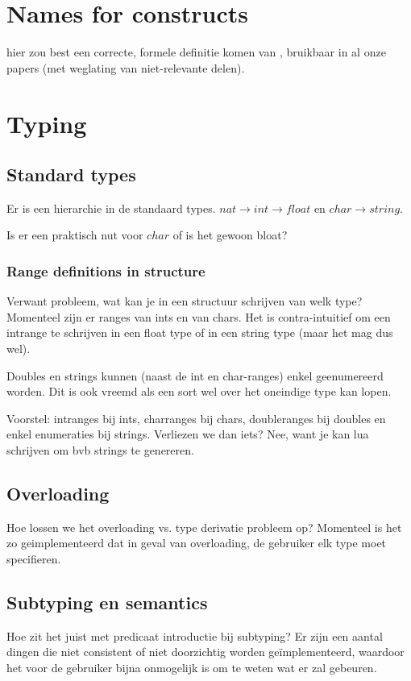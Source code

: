 \documentclass{article}
\begin{document}
\section{Names for \fodot constructs}
hier zou best een correcte, formele definitie komen van \fodot, bruikbaar in al onze papers (met weglating van niet-relevante delen).


\section{Typing}

\subsection{Standard types}
Er is een hierarchie in de standaard types. $nat \rightarrow int \rightarrow float$ en $char \rightarrow string$.

Is er een praktisch nut voor $char$ of is het gewoon bloat?

\subsubsection{Range definitions in structure}
Verwant probleem, wat kan je in een structuur schrijven van welk type? 
Momenteel zijn er ranges van ints en van chars.
Het is contra-intuitief om een intrange te schrijven in een float type of in een string type (maar het mag dus wel).

Doubles en strings kunnen (naast de int en char-ranges) enkel geenumereerd worden. Dit is ook vreemd als een sort wel over het oneindige type kan lopen.

Voorstel:
intranges bij ints, charranges bij chars, doubleranges bij doubles en enkel enumeraties bij strings.
Verliezen we dan iets? Nee, want je kan lua schrijven om bvb strings te genereren. 

\subsection{Overloading}
Hoe lossen we het overloading vs. type derivatie probleem op? Momenteel is het zo geimplementeerd dat in geval van overloading, de gebruiker elk type moet specifieren.

\subsection{Subtyping en semantics}
Hoe zit het juist met predicaat introductie bij subtyping? Er zijn een aantal dingen die niet consistent of niet doorzichtig worden ge\"implementeerd, waardoor het voor de gebruiker bijna onmogelijk is om te weten wat er zal gebeuren.
\end{document}
